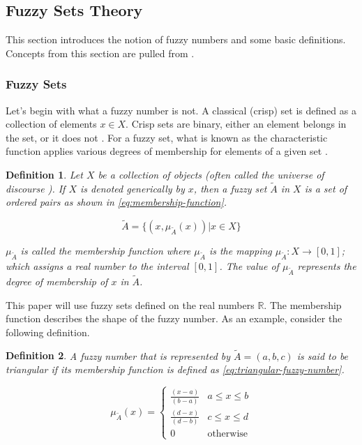\documentclass[11pt,a4paper,final]{article}
\let\ref\autoref                                      %
\newtheorem{definition}{Definition}[section]
\begin{document}
\subsection{Fuzzy Sets Theory}
\label{sec:org0ad8f6b}
This section introduces the notion of fuzzy numbers and some basic definitions. Concepts from this section are pulled
from \cite{zimmermann-2001-fuzzy-set,das-2016-mathem-model,yaghobi-2014-compar-fuzzy,bello-2019-fuzzy-activ}.

\subsubsection{Fuzzy Sets}
\label{sec:org7d4d74e}
Let's begin with what a fuzzy number is not. A classical (crisp) set is defined as a collection of elements \(x \in X\).
Crisp sets are binary, either an element belongs in the set, or it does not \cite{zimmermann-2001-fuzzy-set}. For a
fuzzy set, what is known as the characteristic function applies various degrees of membership for elements of a given
set \cite{zimmermann-2001-fuzzy-set}.

\begin{definition}
Let \(X\) be a collection of objects (often called the universe of discourse \cite{bello-2019-fuzzy-activ}). If \(X\) is denoted
generically by \(x\), then a fuzzy set \(\tilde{A}\) in \(X\) is a set of ordered pairs as shown in \ref{eq:membership-function}.

\begin{equation}
\label{eq:membership-function}
\tilde{A} = \{(x, \mu_{\tilde{A}}(x))| x\in X\}
\end{equation}

\noindent
\(\mu_{\tilde{A}}\) is called the membership function where \(\mu_{\tilde{A}}\) is the mapping \(\mu_{\tilde{A}} : X \rightarrow
[0,1]\); which assigns a real number to the interval \([0,1]\). The value of \(\mu_{\tilde{A}}\) represents the degree of
membership of \(x\) in \(\tilde{A}\).
\end{definition}

This paper will use fuzzy sets defined on the real numbers \(\mathbb{R}\). The membership function describes the shape of
the fuzzy number. As an example, consider the following definition.

\begin{definition}
A fuzzy number that is represented by \(\tilde{A} = (a,b,c)\) is said to be triangular if its membership function is
defined as \ref{eq:triangular-fuzzy-number}.

\begin{equation}
\label{eq:triangular-fuzzy-number}
  \mu_{\tilde{A}}(x) =
  \begin{cases}
    \frac{(x-a)}{(b-a)} & a \le x \le b \\
    \frac{(d-x)}{(d-b)} & c \le x \le d \\
    0                   & \text{otherwise}
  \end{cases}
\end{equation}
\end{definition}
\end{document}

